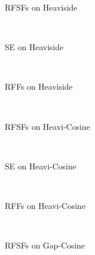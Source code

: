 	\begin{figure*}
		\centering
		\begin{subfigure}{0.32\linewidth}
			\centering
			\imageResultsGpHeavisideRfsf
			\caption{\acsp{RFSF} on Heaviside}
		\end{subfigure}
		~
		\begin{subfigure}{0.32\linewidth}
			\centering
			\imageResultsGpHeavisideRbf
			\caption{\acs{SE} on Heaviside}
			\label{fig:syntheticResultPlotSeHeaviside}
		\end{subfigure}
		~
		\begin{subfigure}{0.32\linewidth}
			\centering
			\imageResultsGpHeavisideRff
			\caption{\acsp{RFF} on Heaviside}
		\end{subfigure}
		\\[0.5cm]
		\begin{subfigure}{0.32\linewidth}
			\centering
			\imageResultsGpHeavicosineRfsf
			\caption{\acsp{RFSF} on Heavi-Cosine}
		\end{subfigure}
		~
		\begin{subfigure}{0.32\linewidth}
			\centering
			\imageResultsGpHeavicosineRbf
			\caption{\acs{SE} on Heavi-Cosine}
			\label{fig:syntheticResultPlotSeHeaviCosine}
		\end{subfigure}
		~
		\begin{subfigure}{0.32\linewidth}
			\centering
			\imageResultsGpHeavicosineRff
			\caption{\acsp{RFF} on Heavi-Cosine}
		\end{subfigure}
		\\[0.5cm]
		\begin{subfigure}{0.32\linewidth}
			\centering
			\imageResultsGpGapcosineRfsf
			\caption{\acsp{RFSF} on Gap-Cosine}
			\label{fig:syntheticResultPlotRfsfGapCosine}
		\end{subfigure}
		~
		\begin{subfigure}{0.32\linewidth}

\end{subfigure}
\end{figure*}
